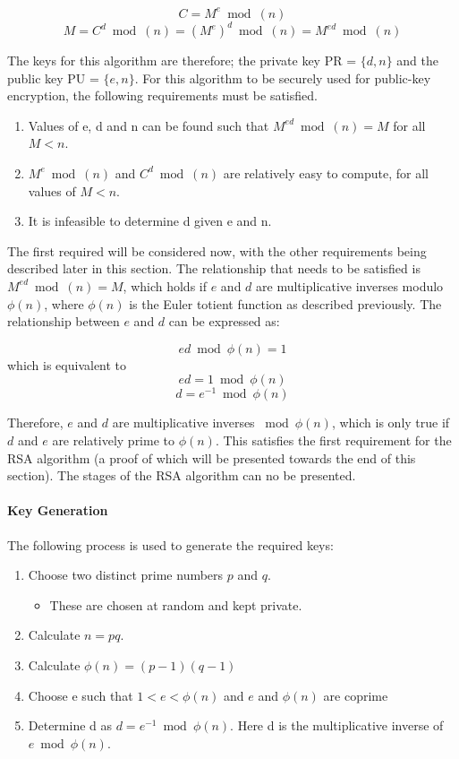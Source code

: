 \documentclass[a4paper,10pt]{report}
\begin{document}
\[ C = M^{e} \bmod(n) \]
\[ M = C^{d} \bmod(n) = (M^{e})^{d} \bmod(n) = M^{ed} \bmod(n)\]

The keys for this algorithm are therefore; the private key PR = $\{d,n\}$ and the public key PU = $\{e,n\}$. For this algorithm to be securely used for public-key encryption, the following requirements must be satisfied.
\begin{enumerate}
  \item Values of e, d and n can be found such that $ M^{ed} \bmod(n) = M $ for all $ M < n $.
  \item $ M^{e} \bmod(n) $ and $ C^{d} \bmod(n) $ are relatively easy to compute, for all values of $ M < n $.
  \item It is infeasible to determine d given e and n.
\end{enumerate}

The first required will be considered now, with the other requirements being described later in this section. The relationship that needs to be satisfied is $ M^{ed} \bmod(n) = M $, which holds if $e$ and $d$ are multiplicative inverses modulo $\phi(n)$, where $\phi(n)$ is the Euler totient function as described previously. The relationship between $e$ and $d$ can be expressed as:

\[ ed \bmod \phi(n) = 1 \]
which is equivalent to
\[ ed = 1 \bmod \phi(n) \]
\[ d = e^{-1} \bmod \phi(n) \]

Therefore, $e$ and $d$ are multiplicative inverses $\bmod \phi(n)$, which is only true if $d$ and $e$ are relatively prime to $\phi(n)$. This satisfies the first requirement for the RSA algorithm (a proof of which will be presented towards the end of this section). The stages of the RSA algorithm can no be presented. 

\paragraph{Key Generation}

The following process is used to generate the required keys:

\begin{enumerate}
  \item Choose two distinct prime numbers $p$ and $q$.
  \begin{itemize}
    \item These are chosen at random and kept private.
  \end{itemize}
  
  \item Calculate $ n=pq $.
  
  \item Calculate $ \phi(n)=(p-1)(q-1) $
  
  \item Choose e such that $ 1 < e < \phi (n) $ and $e$ and $ \phi(n) $ are coprime
  
  \item Determine d as $ d = e^{-1} \bmod \phi (n) $. Here d is the multiplicative inverse of $ e \bmod \phi (n) $.
  
\end{enumerate}
\end{document}

